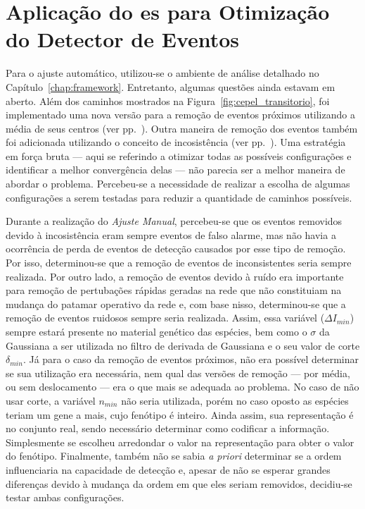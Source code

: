 \FloatBarrier

\section[Aplicação do ES para Otimização do Detector de Eventos]{
Aplicação do \acf{es} para Otimização do Detector de Eventos}
\label{sec:aplic_es}

Para o ajuste automático, utilizou-se o ambiente de análise detalhado
no Capítulo~\ref{chap:framework}. Entretanto, algumas questões ainda
estavam em aberto. Além dos caminhos mostrados na
Figura~\ref{fig:cepel_transitorio}, foi implementado uma nova versão
para a remoção de eventos próximos utilizando a média de seus centros
(ver pp.~\pageref{text:media}). Outra maneira de remoção dos eventos
também foi adicionada utilizando o conceito de incosistência (ver
pp.~\pageref{text:incosistentes}). Uma estratégia em força bruta ---
aqui se referindo a otimizar todas as possíveis configurações e
identificar a melhor convergência delas --- não parecia ser a melhor
maneira de abordar o problema. Percebeu-se a necessidade de realizar a
escolha de algumas configurações a serem testadas para reduzir a
quantidade de caminhos possíveis.

Durante a realização do \emph{Ajuste Manual}, percebeu-se que os
eventos removidos devido à incosistência eram sempre eventos de falso
alarme, mas não havia a ocorrência de perda de eventos de detecção causados por
esse tipo de remoção. Por isso, determinou-se que a remoção de eventos de
inconsistentes seria sempre realizada. Por outro lado, a remoção de
eventos devido à ruído era importante para remoção de pertubações
rápidas geradas na rede que não constituiam na mudança do patamar
operativo da rede e, com base nisso, determinou-se que a remoção de
eventos ruidosos sempre seria realizada. Assim, essa variável
($\Delta I_{min}$) sempre estará presente no material genético das
espécies, bem como o $\sigma$ da Gaussiana a ser utilizada no filtro
de derivada de Gaussiana e o seu valor de corte $\delta_{min}$. Já
para o caso da remoção de eventos próximos, não era possível
determinar se sua utilização era necessária, nem qual das versões de
remoção --- por média, ou sem deslocamento --- era o que mais se
adequada ao problema. No caso de não usar corte, a variável $n_{min}$
não seria utilizada, porém no caso oposto as espécies teriam um gene a
mais, cujo fenótipo é inteiro. Ainda assim, sua representação é no
conjunto real, sendo necessário determinar como codificar a
informação. Simplesmente se escolheu arredondar o valor na
representação para obter o valor do fenótipo. Finalmente, também não
se sabia \emph{a priori} determinar se a ordem influenciaria na
capacidade de detecção e, apesar de não se esperar grandes diferenças
devido à mudança da ordem em que eles seriam removidos, decidiu-se
testar ambas configurações.  

